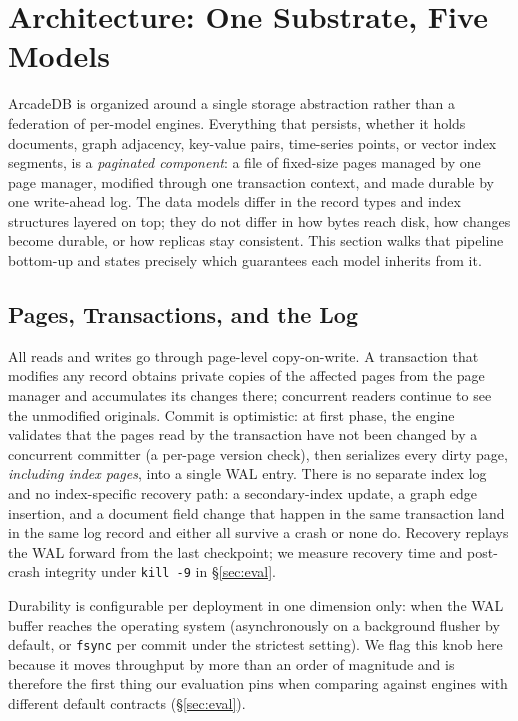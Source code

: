 \documentclass[conference]{IEEEtran}
\newcommand{\arcadedb}{ArcadeDB}
\begin{document}
\section{Architecture: One Substrate, Five Models}\label{sec:architecture}

\arcadedb{} is organized around a single storage abstraction rather than a
federation of per-model engines. Everything that persists, whether it holds
documents, graph adjacency, key-value pairs, time-series points, or vector
index segments, is a \emph{paginated component}: a file of fixed-size pages
managed by one page manager, modified through one transaction context, and
made durable by one write-ahead log. The data models differ in the record
types and index structures layered on top; they do not differ in how bytes
reach disk, how changes become durable, or how replicas stay consistent. This
section walks that pipeline bottom-up and states precisely which guarantees
each model inherits from it.

\subsection{Pages, Transactions, and the Log}\label{sec:pipeline}

All reads and writes go through page-level copy-on-write. A transaction that
modifies any record obtains private copies of the affected pages from the page
manager and accumulates its changes there; concurrent readers continue to see
the unmodified originals. Commit is optimistic: at first phase, the engine
validates that the pages read by the transaction have not been changed by a
concurrent committer (a per-page version check), then serializes every dirty
page, \emph{including index pages}, into a single WAL entry. There is no
separate index log and no index-specific recovery path: a secondary-index
update, a graph edge insertion, and a document field change that happen in the
same transaction land in the same log record and either all survive a crash or
none do. Recovery replays the WAL forward from the last checkpoint; we measure
recovery time and post-crash integrity under \texttt{kill -9} in
\S\ref{sec:eval}.

Durability is configurable per deployment in one dimension only: when the WAL
buffer reaches the operating system (asynchronously on a background flusher by
default, or \texttt{fsync} per commit under the strictest setting). We flag
this knob here because it moves throughput by more than an order of magnitude
and is therefore the first thing our evaluation pins when comparing against
engines with different default contracts (\S\ref{sec:eval}).
\end{document}
